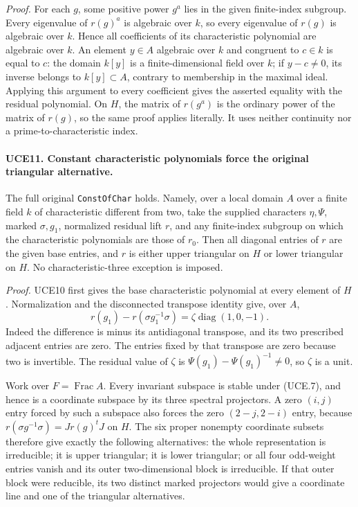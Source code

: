 \documentclass[11pt,a4paper]{article}
\numberwithin{equation}{section}
\theoremstyle{remark}\newtheorem{remark}[theorem]{Remark}
\begin{document}
\emph{Proof.}
For each \(g\), some positive power \(g^a\) lies in the
given finite-index subgroup.  Every eigenvalue of \(r(g)^a\)
is algebraic over \(k\), so every eigenvalue of \(r(g)\) is
algebraic over \(k\).  Hence all coefficients of its characteristic
polynomial are algebraic over \(k\).
An element \(y\in A\) algebraic over \(k\) and congruent to
\(c\in k\) is equal to \(c\): the domain \(k[y]\) is a
finite-dimensional field over \(k\); if \(y-c\ne0\), its
inverse belongs to \(k[y]\subset A\), contrary to membership
in the maximal ideal.  Applying this argument to every coefficient
gives the asserted equality with the residual polynomial.
On \(H\), the matrix of \(r(g^a)\) is the ordinary power
of the matrix of \(r(g)\), so the same proof applies literally.
It uses neither continuity nor a prime-to-characteristic index.

\paragraph{UCE11. Constant characteristic polynomials force the original triangular alternative.}
\label{claim:UCE11}
The full original \texttt{Const\allowbreak Of\allowbreak Char} holds.  Namely, over a local
domain \(A\) over a finite field \(k\) of characteristic different
from two, take the supplied characters \(\eta,\Psi\), marked
\(\sigma,g_1\), normalized residual lift \(r\), and any
finite-index subgroup on which the characteristic polynomials are
those of \(r_0\).  Then all diagonal entries of \(r\) are the
given base entries, and \(r\) is either upper triangular on \(H\)
or lower triangular on \(H\).  No characteristic-three exception
is imposed.

\emph{Proof.}
UCE10 first gives the base characteristic polynomial at every
element of \(H\).  Normalization and the disconnected transpose
identity give, over \(A\),
\[
 r(g_1)-r(\sigma g_1^{-1}\sigma)
       =\zeta\operatorname{diag}(1,0,-1).
 \tag{UCE.7}
\]
Indeed the difference is minus its antidiagonal transpose, and its
two prescribed adjacent entries are zero.  The entries fixed by
that transpose are zero because two is invertible.  The residual
value of \(\zeta\) is \(\Psi(g_1)-\Psi(g_1)^{-1}\ne0\),
so \(\zeta\) is a unit.

Work over \(F=\operatorname{Frac}A\).  Every invariant subspace
is stable under (UCE.7), and hence is a coordinate subspace by
its three spectral projectors.  A zero \((i,j)\) entry forced
by such a subspace also forces the zero \((2-j,2-i)\) entry,
because
\(r(\sigma g^{-1}\sigma)=Jr(g)^tJ\) on \(H\).
The six proper nonempty coordinate subsets therefore give exactly
the following alternatives: the whole representation is irreducible;
it is upper triangular; it is lower triangular; or all four
odd-weight entries vanish and its outer two-dimensional block is
irreducible.  If that outer block were reducible, its two distinct
marked projectors would give a coordinate line and one of the
triangular alternatives.
\end{document}
